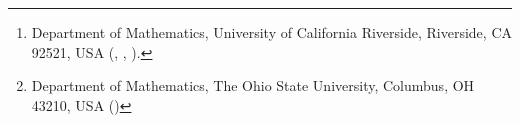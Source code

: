 \author{Jolene Britton\thanks{Department of Mathematics, University of California Riverside, Riverside, CA 92521, USA 
  (, , ).}
\and Yat Tin Chow\footnotemark[2]
\and Weitao Chen\footnotemark[2]
\and Yulong Xing\thanks{Department of Mathematics, The Ohio State University, Columbus, OH 43210, USA
()}}

\usepackage{amsopn}
\DeclareMathOperator{\diag}{diag}


\makeatletter
\newcommand*{\addFileDependency}[1]{%
  \typeout{(#1)}%
  \@addtofilelist{#1}%
  \IfFileExists{#1}{}{\typeout{No file #1.}}%
}
\makeatother

\newcommand*{\myexternaldocument}[1]{%
    \addFileDependency{#1.tex}%
    \addFileDependency{#1.aux}%
}
